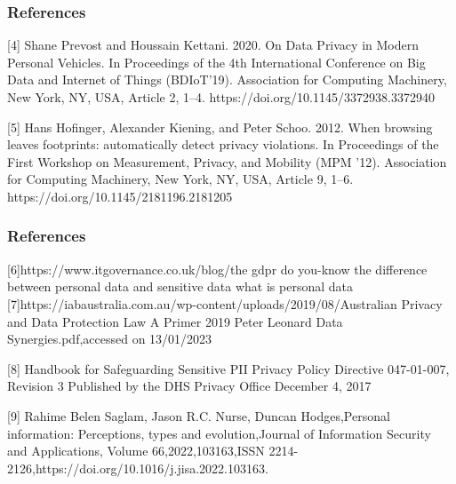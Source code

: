 \documentclass{beamer}
\begin{document}
\begin{frame}
\frametitle{References}

[4] Shane Prevost and Houssain Kettani. 2020. On Data Privacy in Modern Personal Vehicles. In Proceedings of the 4th International Conference on Big Data and Internet of Things (BDIoT'19). Association for Computing Machinery, New York, NY, USA, Article 2, 1–4. https://doi.org/10.1145/3372938.3372940


[5]	Hans Hofinger, Alexander Kiening, and Peter Schoo. 2012. When browsing leaves footprints: automatically detect privacy violations. In Proceedings of the First Workshop on Measurement, Privacy, and Mobility (MPM '12). Association for Computing Machinery, New York, NY, USA, Article 9, 1–6. https://doi.org/10.1145/2181196.2181205
\end{frame}

\begin{frame}
\frametitle{References}

[6]https://www.itgovernance.co.uk/blog/the gdpr do you-know the difference between personal data and sensitive data what is personal data
[7]https://iabaustralia.com.au/wp-content/uploads/2019/08/Australian Privacy and Data Protection Law A Primer 2019 Peter Leonard Data Synergies.pdf,accessed on 13/01/2023


[8] Handbook for Safeguarding Sensitive PII Privacy Policy Directive 047-01-007, Revision 3 Published by the DHS Privacy Office December 4, 2017

[9]	Rahime Belen Saglam, Jason R.C. Nurse, Duncan Hodges,Personal information: Perceptions, types and evolution,Journal of Information Security and Applications,
Volume 66,2022,103163,ISSN 2214-2126,https://doi.org/10.1016/j.jisa.2022.103163.
\end{frame}
\end{document}
